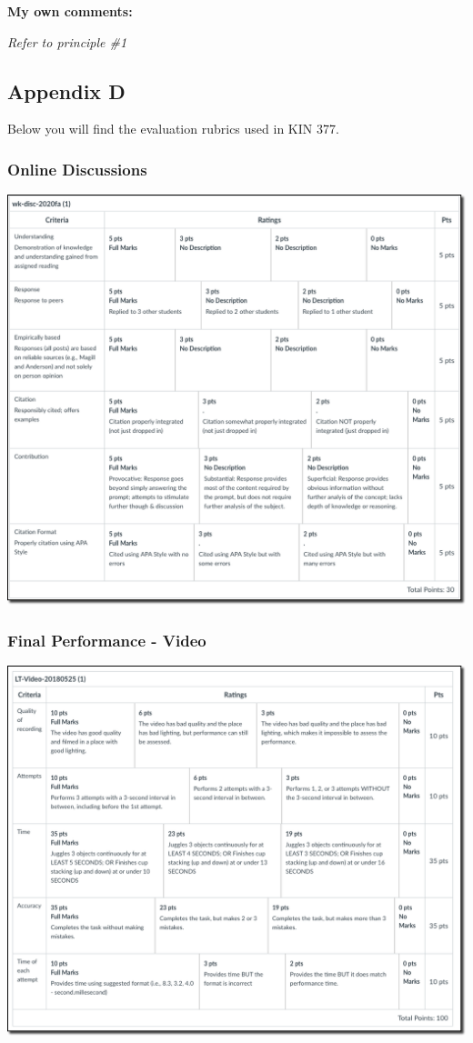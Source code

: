 \documentclass[
  letterpaper,
  DIV=11,
  numbers=noendperiod]{scrartcl}
\begin{document}
\textbf{My own comments:}

\emph{Refer to principle \#1}

\hypertarget{appendix-d}{%
\subsection{Appendix D}\label{appendix-d}}

Below you will find the evaluation rubrics used in KIN 377.

\hypertarget{online-discussions-1}{%
\subsubsection{Online Discussions}\label{online-discussions-1}}

\includegraphics{images/paste-CCDC1445.png}

\hypertarget{final-performance---video}{%
\subsubsection{Final Performance -
Video}\label{final-performance---video}}

\includegraphics{images/paste-97AE7969.png}
\end{document}
